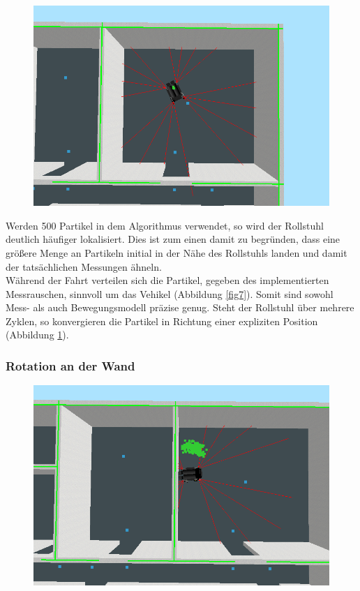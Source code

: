 \documentclass{../Vorlage/mat}
\begin{document}
\begin{figure}[!htbp]
\begin{minipage}{.5\textwidth}
  \includegraphics[scale=0.25]{1_500_gut_konvergiert.png}
  \label{fig8}
\end{minipage}
\end{figure}

Werden 500 Partikel in dem Algorithmus verwendet, so wird der Rollstuhl deutlich häufiger lokalisiert. Dies ist zum einen damit zu begründen, dass eine größere Menge an Partikeln initial in der Nähe des Rollstuhls landen und damit der tatsächlichen Messungen ähneln.\\
Während der Fahrt verteilen sich die Partikel, gegeben des implementierten Messrauschen, sinnvoll um das Vehikel (Abbildung \ref{fig7}). Somit sind sowohl Mess- als auch Bewegungsmodell präzise genug. Steht der Rollstuhl über mehrere Zyklen, so konvergieren die Partikel in Richtung einer expliziten Position (Abbildung \ref{fig8}).
\newpage
\subsubsection*{Rotation an der Wand}
\begin{figure}[!htbp]
  \centering
  \includegraphics[scale=0.3]{1_500_fehler_rotation.png}
  \label{fig9}
\end{figure}
\end{document}
